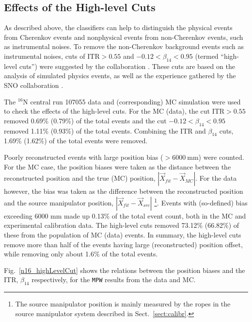 \subsection{Effects of the High-level Cuts}

As described above, the classifiers can help to distinguish the physical events from Cherenkov events and nonphysical events from non-Cherenkov events, such as instrumental noises. To remove the non-Cherenkov background events such as instrumental noises, cuts of $\mathrm{ITR}>0.55$ and $-0.12<\beta_{14}<0.95$ (termed ``high-level cuts'') were suggested by the collaboration \cite{waterunidoc}. These cuts are based on the analysis of simulated physics events, as well as the experience gathered by the SNO collaboration \cite{waterunidoc,dunmore2004separation,marzec2019measurement}. %

The $^{16}$N central run 107055 data and (corresponding) MC simulation were used to check the effects of the high-level cuts. For the MC (data), the cut ITR$>0.55$ removed 0.69\% (0.79\%) of the total events and the cut $-0.12<\beta_{14}<0.95$ removed 1.11\% (0.93\%) of the total events. Combining the ITR and $\beta_{14}$ cuts, 1.69\% (1.62\%) of the total events were removed.

Poorly reconstructed events with large position bias ($>6000~$mm) were counted. For the MC case, the position biases were taken as the distance between the reconstructed position and the true (MC) position, $|\vec{X}_{fit}-\vec{X}_{MC}|$. For the data however, the bias was taken as the difference between the reconstructed position and the source manipulator position, $|\vec{X}_{fit}-\vec{X}_{src}|$ \footnote{The source manipulator position is mainly measured by the ropes in the source manipulator system described in Sect.~\ref{sect:calibr}.}. Events with (so-defined) bias exceeding 6000 mm made up 0.13\% of the total event count, both in the MC and experimental calibration data. The high-level cuts removed 73.12\% (66.82\%) of these from the population of MC (data) events. In summary, the high-level cuts remove more than half of the events having large (reconstructed) position offset, while removing only about 1.6\% of the total events. 

Fig.~\ref{n16_highLevelCut} shows the relations between the position biases and the ITR, $\beta_{14}$ respectively, for the \texttt{MPW} results from the data and MC.

